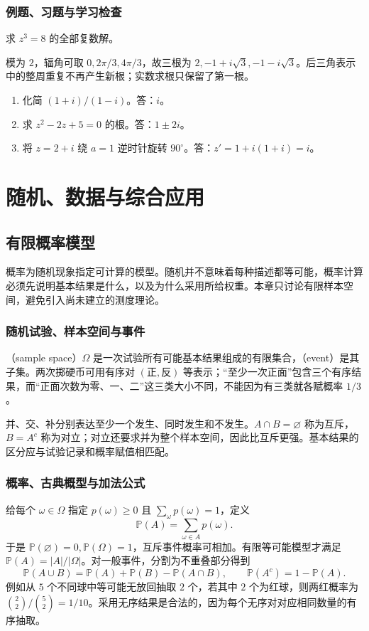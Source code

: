 \documentclass[UTF8]{ctexbook}
\begin{document}
\section{例题、习题与学习检查}
\begin{example}
求 $z^3=8$ 的全部复数解。
\end{example}
\begin{solve}
模为 $2$，辐角可取 $0,2\pi/3,4\pi/3$，故三根为 $2,-1+i\sqrt3,-1-i\sqrt3$。后三角表示中的整周重复不再产生新根；实数求根只保留了第一根。
\end{solve}
\begin{enumerate}
\item 化简 $(1+i)/(1-i)$。答：$i$。
\item 求 $z^2-2z+5=0$ 的根。答：$1\pm2i$。
\item 将 $z=2+i$ 绕 $a=1$ 逆时针旋转 $90^\circ$。答：$z'=1+i(1+i)=i$。
\end{enumerate}

\part{随机、数据与综合应用}

\chapter{有限概率模型}
\label{chap:em-probability}
概率为随机现象指定可计算的模型。随机并不意味着每种描述都等可能，概率计算必须先说明基本结果是什么，以及为什么采用所给权重。本章只讨论有限样本空间，避免引入尚未建立的测度理论。

\section{随机试验、样本空间与事件}
（sample space）$\Omega$ 是一次试验所有可能基本结果组成的有限集合，（event）是其子集。两次掷硬币可用有序对 $(\text{正},\text{反})$ 等表示；“至少一次正面”包含三个有序结果，而“正面次数为零、一、二”这三类大小不同，不能因为有三类就各赋概率 $1/3$。

并、交、补分别表达至少一个发生、同时发生和不发生。$A\cap B=\varnothing$ 称为互斥，$B=A^c$ 称为对立；对立还要求并为整个样本空间，因此比互斥更强。基本结果的区分应与试验记录和概率赋值相匹配。

\section{概率、古典概型与加法公式}
给每个 $\omega\in\Omega$ 指定 $p(\omega)\ge0$ 且 $\sum_\omega p(\omega)=1$，定义
\[
 \mathbb P(A)=\sum_{\omega\in A}p(\omega).
\]
于是 $\mathbb P(\varnothing)=0,\mathbb P(\Omega)=1$，互斥事件概率可相加。有限等可能模型才满足 $\mathbb P(A)=|A|/|\Omega|$。对一般事件，分割为不重叠部分得到
\[
 \mathbb P(A\cup B)=\mathbb P(A)+\mathbb P(B)-\mathbb P(A\cap B),
 \qquad \mathbb P(A^c)=1-\mathbb P(A).
\]
例如从 $5$ 个不同球中等可能无放回抽取 $2$ 个，若其中 $2$ 个为红球，则两红概率为 $\binom22/\binom52=1/10$。采用无序结果是合法的，因为每个无序对对应相同数量的有序抽取。
\end{document}
